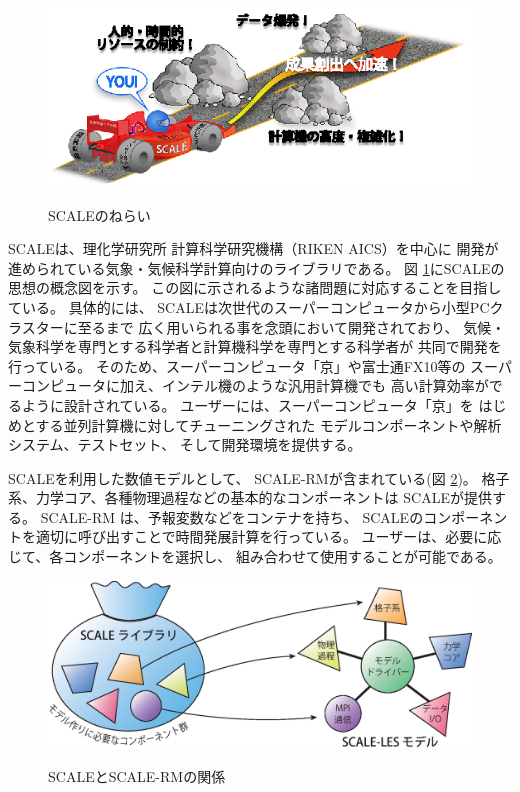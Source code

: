 \begin{figure}[htb]
\begin{center}
  \includegraphics[width=0.9\hsize]{./figure/library.eps}\\
  \caption{SCALEのねらい}
  \label{fig:scale}
\end{center}
\end{figure}

SCALEは、理化学研究所 計算科学研究機構（RIKEN AICS）を中心に
開発が進められている気象・気候科学計算向けのライブラリである。
図 \ref{fig:scale}にSCALEの思想の概念図を示す。
この図に示されるような諸問題に対応することを目指している。
具体的には、
SCALEは次世代のスーパーコンピュータから小型PCクラスターに至るまで
広く用いられる事を念頭において開発されており、
気候・気象科学を専門とする科学者と計算機科学を専門とする科学者が
共同で開発を行っている。
そのため、スーパーコンピュータ「京」や富士通FX10等の
スーパーコンピュータに加え、インテル機のような汎用計算機でも
高い計算効率がでるように設計されている。
ユーザーには、スーパーコンピュータ「京」を
はじめとする並列計算機に対してチューニングされた
モデルコンポーネントや解析システム、テストセット、
そして開発環境を提供する。

SCALEを利用した数値モデルとして、
SCALE-RMが含まれている(図 \ref{fig:scale-rm})。
格子系、力学コア、各種物理過程などの基本的なコンポーネントは
SCALEが提供する。
SCALE-RM は、予報変数などをコンテナを持ち、
SCALEのコンポーネントを適切に呼び出すことで時間発展計算を行っている。
ユーザーは、必要に応じて、各コンポーネントを選択し、
組み合わせて使用することが可能である。


\begin{figure}[hbt]
\begin{center}
  \includegraphics[width=0.9\hsize]{./figure/scale.eps}\\
  \caption{SCALEとSCALE-RMの関係}
  \label{fig:scale-rm}
\end{center}
\end{figure}


